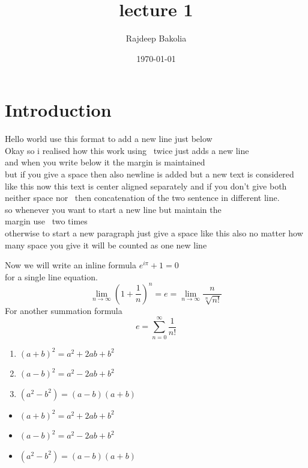 \documentclass{article}
\title{lecture 1}
\author{Rajdeep Bakolia}
\date{\today}
\begin{document}
\maketitle

\section{Introduction}
Hello world use this format to add a new line just below\\
Okay so i realised how this work using \ twice just adds a new line\\
and when you write below it the margin is maintained\\
but if you give a space then also newline is added but a new text is considered\\

like this now this text is center aligned separately and if you don't give both neither space nor \ then concatenation of the two sentence in different line.\\
so whenever you want to start a new line but maintain the \\
margin use \ two times \\ otherwise to start a new paragraph just give a space like this also no matter how many space you give it will be counted as one new line
\newline \newline \newline 

Now we will write an inline formula $e^{i\pi} + 1 = 0$\\
for a single line equation.
$$\lim_{n \to \infty} \left (1 + \frac{1}{n} \right )^n = e = 
\lim_{n \to \infty} \frac{n}{\sqrt[n]{n!}}$$
For another summation formula
$$e = \sum_{n = 0}^{\infty} \frac{1}{n!} $$


\begin{enumerate}
    \item $(a + b)^2 = a^2 + 2ab + b^2$
    \item $(a - b)^2 = a^2 - 2ab + b^2$
    \item $(a^2 - b^2) = (a - b)(a + b)$
\end{enumerate}
\begin{itemize}
    \item $(a + b)^2 = a^2 + 2ab + b^2$
    \item $(a - b)^2 = a^2 - 2ab + b^2$
    \item $(a^2 - b^2) = (a - b)(a + b)$
\end{itemize}
\end{document}
